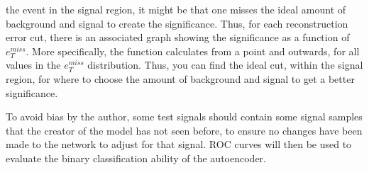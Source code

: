 the event in the signal region, it might be that one misses the ideal amount of background and signal to create 
the significance. Thus, for each reconstruction error cut, there is an associated graph showing the significance 
as a function of $e_T^{miss}$. More specifically, the function calculates from a point and outwards, for all 
values in the $e_T^{miss}$ distribution. Thus, you can find the ideal cut, within the signal region, for where to 
choose the amount of background and signal to get a better significance.\par 
To avoid bias by the author, some test signals should contain some signal samples that the creator of the 
model has not seen before, to ensure no changes have been made to the network to adjust for that signal. ROC 
curves will then be used to evaluate the binary classification ability of the autoencoder. \par 
